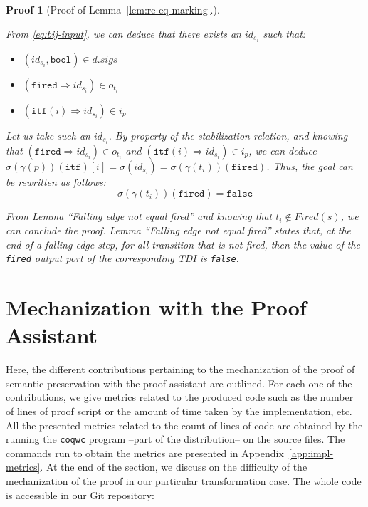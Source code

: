 \documentclass[pdflatex,sn-mathphys]{sn-jnl}%
\theoremstyle{thmstyleone}%
\theoremstyle{thmstyletwo}%
\newtheorem*{pf}{Proof}%
\theoremstyle{thmstylethree}%
\begin{document}
\begin{pf}[Proof of Lemma~\ref{lem:re-eq-marking}.]
\begin{itemize}
\begin{enumerate}
     From \eqref{eq:bij-input}, we can deduce that there exists an
     $id_{s_i}$ such that:
     \begin{itemize}
     \item $(id_{s_i},\mathtt{bool})\in{}d.sigs$
     \item $(\mathtt{fired}\Rightarrow{}id_{s_i})\in{}o_{t_i}$
     \item $(\mathtt{itf}(i)\Rightarrow{}id_{s_i})\in{}i_p$
     \end{itemize}

     Let us take such an $id_{s_i}$. By property of the stabilization
     relation, and knowing that
     $(\mathtt{fired}\Rightarrow{}id_{s_i})\in{}o_{t_i}$ and
     $(\mathtt{itf}(i)\Rightarrow{}id_{s_i})\in{}i_p$, we can deduce
     $\sigma(\gamma(p))(\texttt{itf})[i]=\sigma(id_{s_i})=\sigma(\gamma(t_i))(\texttt{fired})$.
     Thus, the goal can be rewritten as follows:
     \begin{equation*}
       \boxed{\sigma(\gamma(t_i))(\mathtt{fired})=\mathtt{false}}
     \end{equation*}

     From Lemma ``Falling edge not equal fired''
     \cite[p.~351]{Iampietro2021} and knowing that
     $t_i\notin{}Fired(s)$, we can conclude the proof. Lemma ``Falling
     edge not equal fired'' states that, at the end of a falling edge
     step, for all transition that is not fired, then the value of the
     \texttt{fired} output port of the corresponding TDI is
     \texttt{false}.
   \end{enumerate}
 \end{itemize}
 
\end{pf}

\section{Mechanization with the \coq{} Proof Assistant}
\label{sec:mech-of-the-proof}

Here, the different contributions pertaining to the mechanization of
the proof of semantic preservation with the \coq{} proof assistant are
outlined. For each one of the contributions, we give metrics related
to the produced code such as the number of lines of proof script or
the amount of time taken by the implementation, etc. All the presented
metrics related to the count of lines of code are obtained by the
running the \texttt{coqwc} program --part of the \coq{} distribution--
on the source files. The commands run to obtain the metrics are
presented in Appendix~\ref{app:impl-metrics}.  At the end of the
section, we discuss on the difficulty of the mechanization of the
proof in our particular transformation case. The whole code is
accessible in our \textsf{Git} repository:
\end{document}
